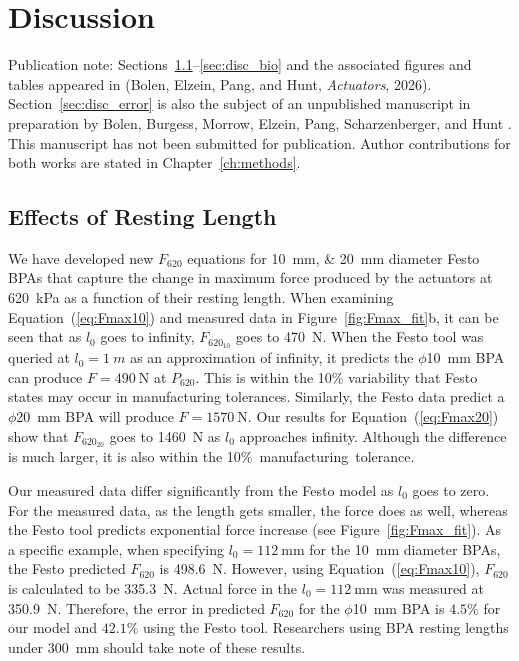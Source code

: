 \chapter{Discussion}\label{ch:discussion}
\graphicspath{{../Figures/40-discussion/}}

{\doublespacing\normalsize\upshape
\noindent Publication note: Sections~\ref{sec:disc_effects}--\ref{sec:disc_bio} and the associated figures and tables appeared in \citet{bolen_2026} (Bolen, Elzein, Pang, and Hunt, \emph{Actuators}, 2026). Section~\ref{sec:disc_error} is also the subject of an unpublished manuscript in preparation by Bolen, Burgess, Morrow, Elzein, Pang, Scharzenberger, and Hunt \citep{bolen_isometric_2025}. This manuscript has not been submitted for publication. Author contributions for both works are stated in Chapter~\ref{ch:methods}.\par}


\section{Effects of Resting Length}\label{sec:disc_effects}
We have developed new $F_{620}$ equations for \qtylist{10;20}{\mm} diameter Festo BPAs that capture the change in maximum force produced by the actuators at  \qty{620}{\kPa} as a function of their resting length. When examining Equation~(\ref{eq:Fmax10}) and measured data in Figure~\ref{fig:Fmax_fit}b, it can be seen that as $l_0$ goes to infinity, $F_{620_{10}}$ goes to \qty{470}{\N}. When the Festo tool \citep{lang_robert_musclesim_2005} was queried at $l_0=\qty{1}{m}$ as an approximation of infinity, it predicts the $\phi$\qty{10}{\mm} BPA can produce $F=\qty{490}{\N}$ at $P_{620}$. This is within the 10\% variability that Festo states may occur in manufacturing tolerances. Similarly, the Festo data predict a $\phi$\qty{20}{\mm} BPA will produce $F=\qty{1570}{\N}$. Our results for Equation~(\ref{eq:Fmax20}) show that  $F_{620_{20}}$ goes to \qty{1460}{\N} as $l_0$ approaches infinity. Although the difference is much larger, it is also within the \mbox{10\% manufacturing tolerance. }

Our measured data differ significantly from the Festo model as $l_0$ goes to zero. For the measured data, as the length gets smaller, the force does as well, whereas the Festo tool predicts exponential force increase (see Figure~\ref{fig:Fmax_fit}). As a specific example, when specifying $l_0=\qty{112}{\mm}$ for the \qtylist{10}{\mm} diameter BPAs, the Festo predicted $F_{620}$ is \qtylist{498.6}{\N}. However, using Equation~(\ref{eq:Fmax10}), $F_{620}$ is calculated to be \qtylist{335.3}{\N}. Actual force in the $l_0=\qty{112}{\mm}$ was measured at \qtylist{350.9}{\N}. Therefore, the error in predicted $F_{620}$ for the $\phi$\qty{10}{\mm} BPA is $4.5\%$ for our model and $42.1\%$ using the Festo tool. Researchers using BPA resting lengths under \qty{300}{\mm} should take note of these results.

